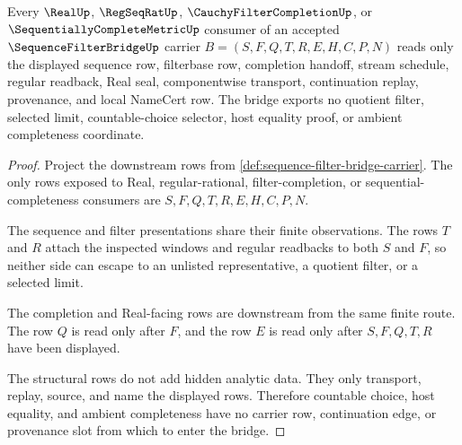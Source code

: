 \begin{theorem}\label{thm:sequence-filter-bridge-completion-nonescape}
Every $\RealUp$, $\RegSeqRatUp$, $\CauchyFilterCompletionUp$, or $\SequentiallyCompleteMetricUp$ consumer of an accepted $\SequenceFilterBridgeUp$ carrier $B=(S,F,Q,T,R,E,H,C,P,N)$ reads only the displayed sequence row, filterbase row, completion handoff, stream schedule, regular readback, Real seal, componentwise transport, continuation replay, provenance, and local NameCert row. The bridge exports no quotient filter, selected limit, countable-choice selector, host equality proof, or ambient completeness coordinate.
\end{theorem}
\begin{proof}
Project the downstream rows from \autoref{def:sequence-filter-bridge-carrier}. The only rows exposed to Real, regular-rational, filter-completion, or sequential-completeness consumers are $S,F,Q,T,R,E,H,C,P,N$.

The sequence and filter presentations share their finite observations. The rows $T$ and $R$ attach the inspected windows and regular readbacks to both $S$ and $F$, so neither side can escape to an unlisted representative, a quotient filter, or a selected limit.

The completion and Real-facing rows are downstream from the same finite route. The row $Q$ is read only after $F$, and the row $E$ is read only after $S,F,Q,T,R$ have been displayed.

The structural rows do not add hidden analytic data. They only transport, replay, source, and name the displayed rows. Therefore countable choice, host equality, and ambient completeness have no carrier row, continuation edge, or provenance slot from which to enter the bridge.
\end{proof}



